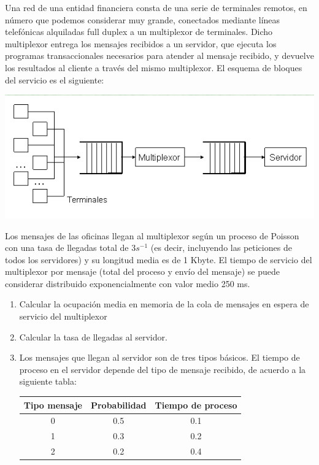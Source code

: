 \begin{problem}[8]\label{tema2:prob8}
Una red de una entidad financiera consta de una serie de terminales remotos, en número que podemos considerar muy grande, conectados mediante líneas telefónicas alquiladas full duplex a un multiplexor de terminales. Dicho multiplexor entrega los mensajes recibidos a un servidor, que ejecuta los programas transaccionales necesarios para atender al mensaje recibido, y devuelve los resultados al cliente a través del mismo multiplexor. El esquema de bloques del servicio es el siguiente:

\begin{center}
  \includegraphics[keepaspectratio=true,width=\linewidth]{img/ej8.png}
\end{center}

Los mensajes de las oficinas llegan al multiplexor según un proceso de Poisson con una tasa de llegadas total de 3$s^{-1}$ (es decir, incluyendo las peticiones de todos los servidores) y su longitud media es de 1 Kbyte. El tiempo de servicio del multiplexor por mensaje (total del proceso y envío del mensaje) se puede considerar distribuido exponencialmente con valor medio 250 ms.

\begin{enumerate}
\item Calcular la ocupación media en memoria de la cola de mensajes en espera de servicio del multiplexor
\item Calcular la tasa de llegadas al servidor.
\item Los mensajes que llegan al servidor son de tres tipos básicos. El tiempo de proceso en el servidor depende del tipo de mensaje recibido, de acuerdo a la siguiente tabla:

\begin{center}
\begin{tabular}{| c | c | c |}
\hline
  \textbf{Tipo mensaje} &  \textbf{Probabilidad} & \textbf{Tiempo de proceso}\\
\hline
0 & 0.5 & 0.1 \\
1 & 0.3 & 0.2 \\
2 & 0.2 & 0.4 \\
\hline
\end{tabular}
\end{center}


\end{enumerate}
\end{problem}
